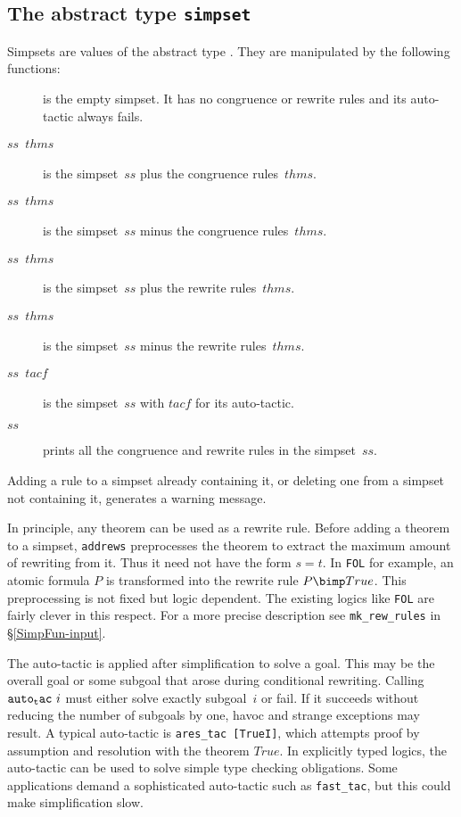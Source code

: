 \subsection{The abstract type {\tt simpset}}\label{simp-simpsets}
Simpsets are values of the abstract type .  They are
manipulated by the following functions:
\begin{description}
\item[] 
is the empty simpset.  It has no congruence or rewrite rules and its
auto-tactic always fails.

\item[\tt $ss$  $thms$] 
is the simpset~$ss$ plus the congruence rules~$thms$.

\item[\tt $ss$  $thms$] 
is the simpset~$ss$ minus the congruence rules~$thms$.

\item[\tt $ss$  $thms$] 
is the simpset~$ss$ plus the rewrite rules~$thms$.

\item[\tt $ss$  $thms$] 
is the simpset~$ss$ minus the rewrite rules~$thms$.

\item[\tt $ss$  $tacf$] 
is the simpset~$ss$ with $tacf$ for its auto-tactic.

\item[ $ss$] 
prints all the congruence and rewrite rules in the simpset~$ss$.
\end{description}
Adding a rule to a simpset already containing it, or deleting one
from a simpset not containing it, generates a warning message.

In principle, any theorem can be used as a rewrite rule.  Before adding a
theorem to a simpset, {\tt addrews} preprocesses the theorem to extract the
maximum amount of rewriting from it.  Thus it need not have the form $s=t$.
In {\tt FOL} for example, an atomic formula $P$ is transformed into the
rewrite rule $P \bimp True$.  This preprocessing is not fixed but logic
dependent.  The existing logics like {\tt FOL} are fairly clever in this
respect.  For a more precise description see {\tt mk_rew_rules} in
\S\ref{SimpFun-input}.  

The auto-tactic is applied after simplification to solve a goal.  This may
be the overall goal or some subgoal that arose during conditional
rewriting.  Calling ${\tt auto_tac}~i$ must either solve exactly
subgoal~$i$ or fail.  If it succeeds without reducing the number of
subgoals by one, havoc and strange exceptions may result.
A typical auto-tactic is {\tt ares_tac [TrueI]}, which attempts proof by
assumption and resolution with the theorem $True$.  In explicitly typed
logics, the auto-tactic can be used to solve simple type checking
obligations.  Some applications demand a sophisticated auto-tactic such as
{\tt fast_tac}, but this could make simplification slow.
  
